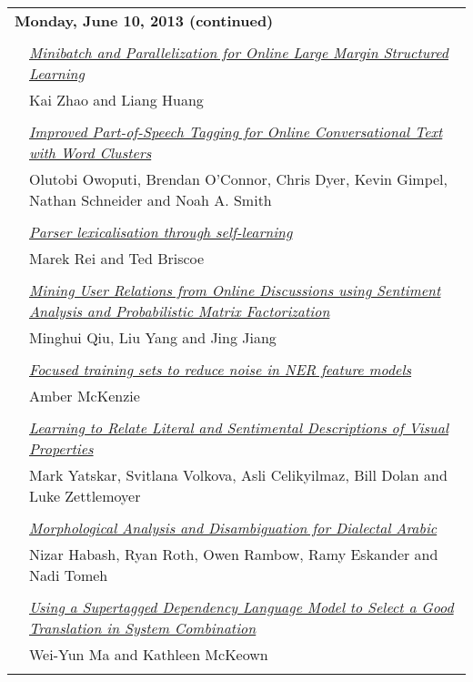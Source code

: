 \begin{tabular}{p{20mm}p{138mm}}
\\
\multicolumn{2}{l}{\bf Monday, June 10, 2013
 (continued)} \\\\
 & \hyperlink{page.370}{\em Minibatch and Parallelization for Online Large Margin Structured Learning}\\
         & Kai Zhao and Liang Huang \\
\\

 & \hyperlink{page.380}{\em Improved Part-of-Speech Tagging for Online Conversational Text with Word Clusters}\\
         & Olutobi Owoputi, Brendan O'Connor, Chris Dyer, Kevin Gimpel, Nathan Schneider and Noah A. Smith \\
\\

 & \hyperlink{page.391}{\em Parser lexicalisation through self-learning}\\
         & Marek Rei and Ted Briscoe \\
\\

 & \hyperlink{page.401}{\em Mining User Relations from Online Discussions using Sentiment Analysis and Probabilistic Matrix Factorization}\\
         & Minghui Qiu, Liu Yang and Jing Jiang \\
\\

 & \hyperlink{page.411}{\em Focused training sets to reduce noise in NER feature models}\\
         & Amber McKenzie \\
\\

 & \hyperlink{page.416}{\em Learning to Relate Literal and Sentimental Descriptions of Visual Properties}\\
         & Mark Yatskar, Svitlana Volkova, Asli Celikyilmaz, Bill Dolan and Luke Zettlemoyer \\
\\

 & \hyperlink{page.426}{\em Morphological Analysis and Disambiguation for Dialectal Arabic}\\
         & Nizar Habash, Ryan Roth, Owen Rambow, Ramy Eskander and Nadi Tomeh \\
\\

 & \hyperlink{page.433}{\em Using a Supertagged Dependency Language Model to Select a Good Translation in System Combination}\\
         & Wei-Yun Ma and Kathleen McKeown \\
\\


\end{tabular}
